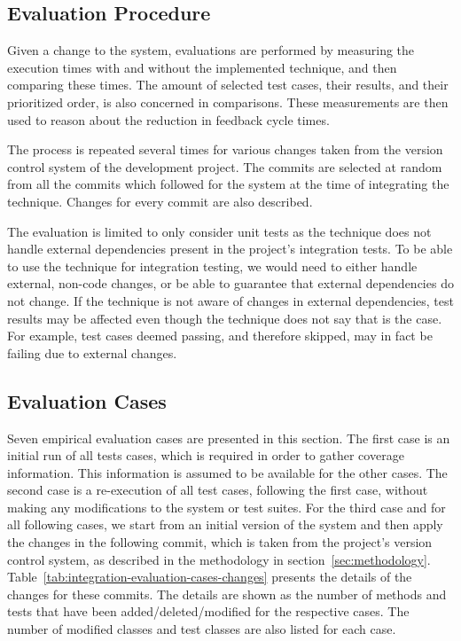\documentclass[a4paper,english,12pt]{report}
\begin{document}
\subsection{Evaluation Procedure}
Given a change to the system, evaluations are performed by measuring the execution times with and without the implemented technique, and then comparing these times. The amount of selected test cases, their results, and their prioritized order, is also concerned in comparisons. These measurements are then used to reason about the reduction in feedback cycle times.

The process is repeated several times for various changes taken from the version control system of the development project. The commits are selected at random from all the commits which followed for the system at the time of integrating the technique. Changes for every commit are also described.

The evaluation is limited to only consider unit tests as the technique does not handle external dependencies present in the project's integration tests. To be able to use the technique for integration testing, we would need to either handle external, non-code changes, or be able to guarantee that external dependencies do not change. If the technique is not aware of changes in external dependencies, test results may be affected even though the technique does not say that is the case. For example, test cases deemed passing, and therefore skipped, may in fact be failing due to external changes.

\subsection{Evaluation Cases}\label{sec:evaluation-cases}
Seven empirical evaluation cases are presented in this section. The first case is an initial run of all tests cases, which is required in order to gather coverage information. This information is assumed to be available for the other cases. The second case is a re-execution of all test cases, following the first case, without making any modifications to the system or test suites. For the third case and for all following cases, we start from an initial version of the system and then apply the changes in the following commit, which is taken from the project's version control system, as described in the methodology in section~\ref{sec:methodology}. Table~\vref{tab:integration-evaluation-cases-changes} presents the details of the changes for these commits. The details are shown as the number of methods and tests that have been added/deleted/modified for the respective cases. The number of modified classes and test classes are also listed for each case.
\end{document}
